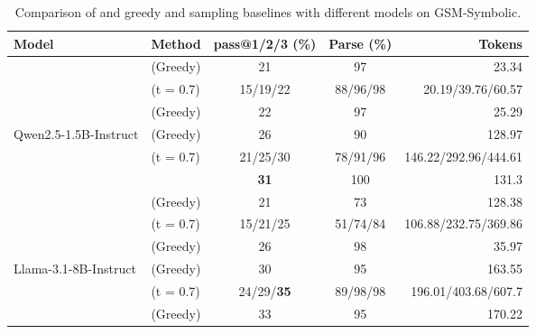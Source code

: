 \begin{table*}[t]
    \centering
    \small
    \caption{Comparison of \Tool{} and greedy and sampling baselines with different models on GSM-Symbolic.}
    \begin{tabular}{llccr}
        \toprule
        \textbf{Model} & \textbf{Method} & \textbf{pass@1/2/3 (\%)} & \textbf{Parse (\%)} &  \textbf{Tokens} \\
        
\midrule
     & \stdUnconstrained{} (Greedy) & 21 & 97 & 23.34\\
     & \stdUnconstrained{} (t = 0.7) & 15/19/22 & 88/96/98 & 20.19/39.76/60.57\\
 & \stdConstrained{} (Greedy) & 22 & 97 & 25.29 \\
 Qwen2.5-1.5B-Instruct & \cotUnconstrained{} (Greedy) & 26 & 90 & 128.97\\
 & \cotUnconstrained{} (t = 0.7) & 21/25/30 & 78/91/96 & 146.22/292.96/444.61\\
 & \textbf{\Tool{}} & \textbf{31} & 100 & 131.3\\

\midrule

     & \stdUnconstrained{} (Greedy) & 21 & 73 & 128.38\\
     & \stdUnconstrained{} (t = 0.7) & 15/21/25  & 51/74/84 & 106.88/232.75/369.86\\
 & \stdConstrained{} (Greedy) & 26 & 98 & 35.97 \\
 Llama-3.1-8B-Instruct & \cotUnconstrained{} (Greedy) & 30 & 95 & 163.55 \\
 & \cotUnconstrained{} (t = 0.7) & 24/29/\textbf{35} & 89/98/98 & 196.01/403.68/607.7\\
 & \textbf{\Tool{}} (Greedy) & 33 & 95 & 170.22 \\



\bottomrule
    \end{tabular}
    \label{tab:rejection_sample_gsm}
    \vspace{-.2in}
\end{table*}